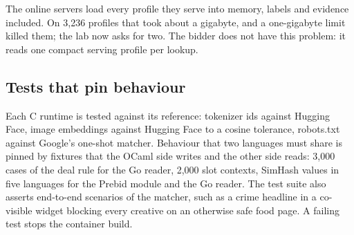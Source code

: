 The online servers load every profile they serve into memory, labels and evidence included. On 3,236 profiles that took about a gigabyte, and a one-gigabyte limit killed them; the lab now asks for two. The bidder does not have this problem: it reads one compact serving profile per lookup.

\subsection{Tests that pin behaviour}\label{sec:impl-tests}

Each C runtime is tested against its reference: tokenizer ids against Hugging Face, image embeddings against Hugging Face to a cosine tolerance, robots.txt against Google's one-shot matcher. Behaviour that two languages must share is pinned by fixtures that the OCaml side writes and the other side reads: 3,000 cases of the deal rule for the Go reader, 2,000 slot contexts, SimHash values in five languages for the Prebid module and the Go reader. The test suite also asserts end-to-end scenarios of the matcher, such as a crime headline in a co-visible widget blocking every creative on an otherwise safe food page. A failing test stops the container build.
